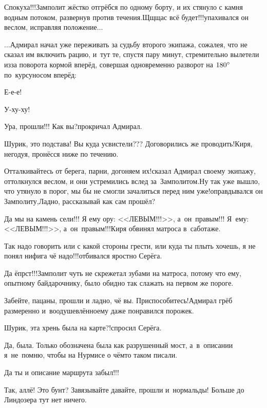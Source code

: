\diagdash Спокуха!!!\mdash Замполит жёстко отгрёбся по одному борту, и их стянуло с камня водным потоком, развернув против течения.\mdash Щ\sdash щ\sdash щас всё будет!!!\mdash упахивался он веслом, исправляя положение$\ldots$

\vspace{0.3cm}
$\ldots$Адмирал начал уже переживать за судьбу второго экипажа, сожалея, что не сказал им включить рацию, и~тут те, спустя пару минут, стремительно вылетели из\sdash за поворота кормой вперёд, совершая одновременно разворот на $180\degree$ по~курсу\mdash носом вперёд:

\diagdash Е-е-е!

\diagdash У-ху-ху!

\diagdash Ура, прошли!!! Как вы?\mdash прокричал Адмирал.

\diagdash Шурик, это подстава! Вы куда усвистели??? Договорились же проводить!\mdash Киря, негодуя, пронёсся ниже по течению.

\diagdash Отталкивайтесь от берега, парни, догоняем их!\mdash сказал Адмирал своему экипажу, оттолкнулся веслом, и они устремились вслед за~Замполитом.\mdash Ну так уже вышло, что утянуло в порог, мы бы не смогли зачалиться перед ним уже!\mdash оправдывался он Замполиту,\mdash Ладно, рассказывай как сам прошёл?

\diagdash Да мы на камень сели!!! Я ему ору: <<ЛЕВЫМ!!!>>, а~он~правым!!! Я~ему: <<ЛЕВЫМ!!!>>, а~он~правым!!!\mdash Киря обвинял матроса в~саботаже.

\diagdash Так надо говорить или с какой стороны грести, или куда ты плыть хочешь, я не понял нифига чё надо!!!\mdash отбивался яростно Серёга.

\diagdash Да ёпрст!!!\mdash Замполит чуть не скрежетал зубами на матроса, потому что ему, опытному байдарочнику, было обидно так слажать на первом же пороге.

\diagdash Забейте, пацаны, прошли и ладно, чё вы. Приспособитесь!\mdash Адмирал грёб размеренно и~воодушевлённо\mdash ему даже понравился порожек.

\diagdash Шурик, эта хрень была на карте?!\mdash спросил Серёга.

\diagdash Да, была. Только обозначена была как разрушенный мост, а~в~описании я~не~помню, чтобы на Нурмисе о чём\sdash то таком писали.

\diagdash Да ты и описание маршрута забыл!!!

\diagdash Так, аллё! Это бунт? Завязывайте давайте, прошли и~нормальды! Больше до Линдозера тут нет ничего.

